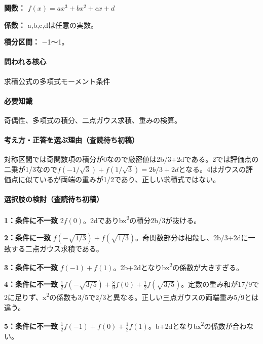 \noindent\textbf{関数：} \(f(x)=ax^3+bx^2+cx+d\)\par

\noindent\textbf{係数：} a,b,c,dは任意の実数。\par

\noindent\textbf{積分区間：} −1〜1。\par

\paragraph{問われる核心} 求積公式の多項式モーメント条件

\paragraph{必要知識} 奇偶性、多項式の積分、二点ガウス求積、重みの検算。

\paragraph{考え方・正答を選ぶ理由（査読待ち初稿）} 対称区間では奇関数項の積分が0なので厳密値は2b/3+2dである。2では評価点の二乗が1/3なので\(f(-1/\sqrt3)+f(1/\sqrt3)=2b/3+2d\)となる。4はガウスの評価点に似ているが両端の重みが1/2であり、正しい求積式ではない。

\paragraph{選択肢の検討（査読待ち初稿）}\mbox{}\par

\noindent\textbf{1：条件に不一致} \(2f(0)\)。2dでありbx\textsuperscript{2}の積分2b/3が抜ける。\par

\noindent\textbf{2：条件に一致} \(f(-\sqrt{1/3})+f(\sqrt{1/3})\)。奇関数部分は相殺し、2b/3+2dに一致する二点ガウス求積である。\par

\noindent\textbf{3：条件に不一致} \(f(-1)+f(1)\)。2b+2dとなりbx\textsuperscript{2}の係数が大きすぎる。\par

\noindent\textbf{4：条件に不一致} \(\frac12f(-\sqrt{3/5})+\frac89f(0)+\frac12f(\sqrt{3/5})\)。定数の重み和が17/9で2に足りず、x\textsuperscript{2}の係数も3/5で2/3と異なる。正しい三点ガウスの両端重み5/9とは違う。\par

\noindent\textbf{5：条件に不一致} \(\frac12f(-1)+f(0)+\frac12f(1)\)。b+2dとなりbx\textsuperscript{2}の係数が合わない。\par

